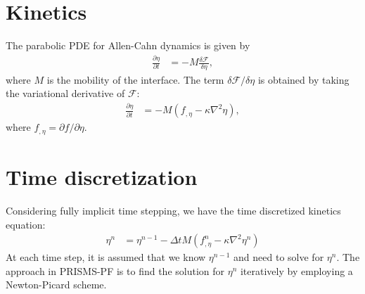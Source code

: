 \documentclass[10pt]{article}
\begin{document}
\section{Kinetics}
The parabolic PDE for Allen-Cahn dynamics is given by
\begin{align}
  \frac{\partial \eta}{\partial t} &= -M\frac{\delta \mathcal{F}}{\delta \eta},
\end{align}
where $M$ is the mobility of the interface. The term $\delta \mathcal{F}/\delta \eta$ is obtained by taking the variational derivative of $ \mathcal{F}$:
\begin{align}
\label{ACPDE}
 \frac{\partial \eta}{\partial t} &= -M(f_{,\eta} -  \kappa \nabla^2\eta),
\end{align}
where $f_{,\eta}=\partial f/\partial \eta$.
	
\section{Time discretization}
Considering fully implicit time stepping, we have the time discretized kinetics equation:
\begin{align}
\label{discrete_form}
 \eta^{n} &= \eta^{n-1} - \Delta t M(f_{,\eta}^{n} -  \kappa \nabla^2 \eta^{n})
\end{align}
At each time step, it is assumed that we know $\eta^{n-1}$ and need to solve for $\eta^{n}$. The approach in PRISMS-PF is to find the solution for $\eta^{n}$ iteratively by employing a Newton-Picard scheme. 
\end{document}
